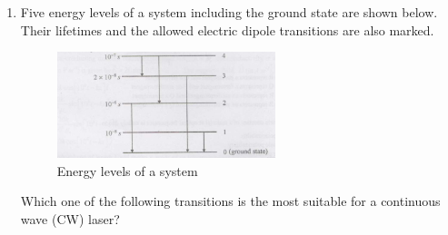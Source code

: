 \documentclass[14pt, a4paper]{extarticle}
\begin{document}
\begin{enumerate}[label=\textbf{Q. \arabic*}, start=21]
\begin{enumerate}
\end{enumerate}

\vspace{12em}

\item Five energy levels of a system including the ground state are shown below.
Their lifetimes and the allowed electric dipole transitions are also marked.
\begin{figure}[H]
\centering
\includegraphics[width=0.6\textwidth]{figs/Q31fig.png}
\caption{Energy levels of a system}
\label{fig:q31}
\end{figure}
Which one of the following transitions is the most suitable for a continuous wave (CW) laser?
\begin{enumerate}
\end{enumerate}


\end{enumerate}
\end{document}
